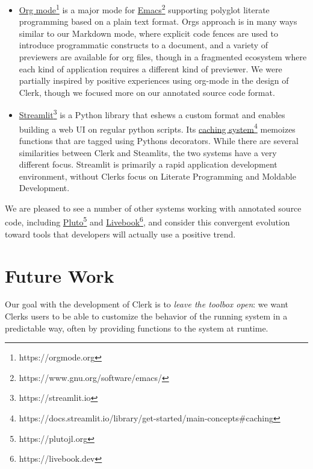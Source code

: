 \documentclass[sigconf,screen]{acmart}
\begin{document}
\begin{itemize}
\item
  {\href{https://orgmode.org}{Org mode}\footnote{https://orgmode.org}} is a major mode for {\href{https://www.gnu.org/software/emacs/}{Emacs}\footnote{https://www.gnu.org/software/emacs/}} supporting polyglot literate programming based on a plain text format. Org\textquotesingle s approach is in many ways similar to our Markdown mode, where explicit code fences are used to introduce programmatic constructs to a document, and a variety of previewers are available for org files, though in a fragmented ecosystem where each kind of application requires a different kind of previewer. We were partially inspired by positive experiences using org-mode in the design of Clerk, though we focused more on our annotated source code format.
\item
  {\href{https://streamlit.io}{Streamlit}\footnote{https://streamlit.io}} is a Python library that eshews a custom format and enables building a web UI on regular python scripts. Its {\href{https://docs.streamlit.io/library/get-started/main-concepts\#caching}{caching system}\footnote{https://docs.streamlit.io/library/get-started/main-concepts\#caching}} memoizes functions that are tagged using Python\textquotesingle s decorators. While there are several similarities between Clerk and Steamlits, the two systems have a very different focus. Streamlit is primarily a rapid application development environment, without Clerk\textquotesingle s focus on Literate Programming and Moldable Development.
\end{itemize}

We are pleased to see a number of other systems working with annotated source code, including {\href{https://plutojl.org}{Pluto}\footnote{https://plutojl.org}} and {\href{https://livebook.dev}{Livebook}\footnote{https://livebook.dev}}, and consider this convergent evolution toward tools that developers will actually use a positive trend.

\hypertarget{future-work}{%
\section{Future Work}\label{future-work}}

Our goal with the development of Clerk is to \emph{leave the toolbox open}: we want Clerk\textquotesingle s users to be able to customize the behavior of the running system in a predictable way, often by providing functions to the system at runtime.
\end{document}
